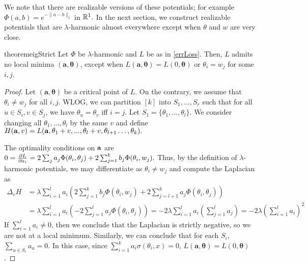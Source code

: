 We note that there are realizable versions of these potentials; for
example $\Phi(a,b) = e^{-\|a-b\|_1}$ in ${\mathbb{R}}^1.$
In the next section, we construct  realizable potentials that are 
$\lambda$-harmonic almost everywhere except when $\theta$ and $w$ are very close. 
%
\begin{restatable}{theorem}{eigStrict}
\label{EigStrict}
Let $\Phi$ be $\lambda$-harmonic and $L$ be as in \eqref{errLoss}. Then,
$L$ admits no local minima $\boldsymbol{(a,\theta)}$, except when
$L(\boldsymbol{a,\theta}) = L(0,\boldsymbol{\theta})$ or $\theta_i = w_j$ for some $i,j$. 
\end{restatable}
\begin{proof}
  Let $(\boldsymbol{a,\theta})$ be a critical point of $L.$ On the
  contrary, we assume that $\theta_i \neq w_j$ for all $i,j.$ WLOG, we
  can partition $[k]$ into $S_1,...,S_r$ such that for all $u \in S_i,
  v \in S_j$, we have $\theta_{u} = \theta_v$ iff $i=j$. 
%
Let $S_1 = \{ \theta_1, \ldots, \theta_{l}\}.$ 
We consider changing all
$\theta_1, \ldots, \theta_{l}$ by the same $v$ and define 
%
$H({\bf a}, v) = L({\bf a},\theta_1+v,...,\theta_l+v, \theta_{l+1}
\ldots, \theta_k).$

The optimality conditions on ${\bf a}$ are
$
0 = \frac{\partial L}{\partial a_i} =  2\sum_{j} a_j \Phi(\theta_i,\theta_j)
  + 2\sum_{j=1}^k b_j \Phi(\theta_i,w_j).
$
%
Thus, by the definition of $\lambda$-harmonic potentials, we may differentiate as $\theta_i \neq w_j$ and compute the Laplacian as 
\begin{align*}
\Delta_v H & = \lambda\sum_{i=1}^l a_i \left(2\sum_{j=1}^k b_j
  \Phi(\theta_i, w_j) + 2\sum_{j=l+1}^k a_j
  \Phi(\theta_i, \theta_j)\right) \\
& = \lambda\sum_{i=1}^l a_i \left( - 2
  \sum_{j = 1}^l  a_j \Phi(\theta_i,\theta_j)\right) 
%
%
 = -2\lambda\sum_{i=1}^l a_i \left( 
  \sum_{j = 1}^l  a_j \right) = -2 \lambda\left(\sum_{i=1}^l a_i\right)^2
\end{align*} 
%
If $\sum_{i=1}^l a_i \neq 0$, then we conclude that the Laplacian is
strictly negative, so we are not at a local minimum. 
%
Similarly, we can conclude that for each $S_i,$ 
 $\sum_{u \in S_i} a_u = 0$. In this case, since $\sum_{i=1}^k a_i \sigma(\theta_i,x) = 0$, $L(\boldsymbol{a,\theta}) = L(0,\boldsymbol{\theta})$. 
\end{proof} 

